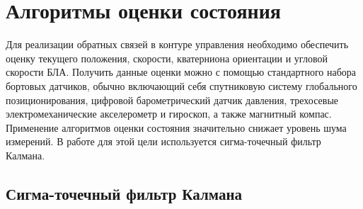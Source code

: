 
\chapter{Алгоритмы оценки состояния}
\label{chapter_estimation}

Для реализации обратных связей в контуре управления необходимо обеспечить оценку текущего положения, скорости, кватерниона ориентации и угловой скорости БЛА. Получить данные оценки можно с помощью стандартного набора бортовых датчиков, обычно включающий себя спутниковую систему глобального позиционирования, цифровой барометрический датчик давления, трехосевые электромеханические акселерометр и гироскоп, а также магнитный компас. Применение алгоритмов оценки состояния значительно снижает уровень шума измерений. В работе для этой цели используется сигма-точечный фильтр Калмана.

\section{Сигма-точечный фильтр Калмана}

